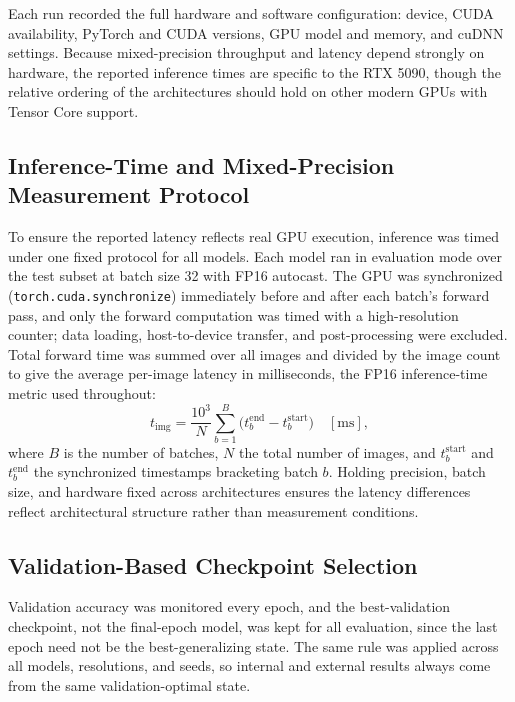\documentclass[conference]{IEEEtran}
\begin{document}
Each run recorded the full hardware and software configuration: device, CUDA availability, PyTorch and CUDA versions, GPU model and memory, and cuDNN settings. Because mixed-precision throughput and latency depend strongly on hardware, the reported inference times are specific to the RTX 5090, though the relative ordering of the architectures should hold on other modern GPUs with Tensor Core support.

\subsection{Inference-Time and Mixed-Precision Measurement Protocol}

To ensure the reported latency reflects real GPU execution, inference was timed under one fixed protocol for all models. Each model ran in evaluation mode over the test subset at batch size 32 with FP16 autocast. The GPU was synchronized (\texttt{torch.cuda.synchronize}) immediately before and after each batch's forward pass, and only the forward computation was timed with a high-resolution counter; data loading, host-to-device transfer, and post-processing were excluded. Total forward time was summed over all images and divided by the image count to give the average per-image latency in milliseconds, the FP16 inference-time metric used throughout:
\begin{equation}
t_{\text{img}} = \frac{10^{3}}{N}\sum_{b=1}^{B}\big(t^{\text{end}}_b - t^{\text{start}}_b\big)\quad[\text{ms}],
\label{eq:latency}
\end{equation}
where $B$ is the number of batches, $N$ the total number of images, and $t^{\text{start}}_b$ and $t^{\text{end}}_b$ the synchronized timestamps bracketing batch $b$. Holding precision, batch size, and hardware fixed across architectures ensures the latency differences reflect architectural structure rather than measurement conditions.

\subsection{Validation-Based Checkpoint Selection}

Validation accuracy was monitored every epoch, and the best-validation checkpoint, not the final-epoch model, was kept for all evaluation, since the last epoch need not be the best-generalizing state. The same rule was applied across all models, resolutions, and seeds, so internal and external results always come from the same validation-optimal state.
\end{document}
